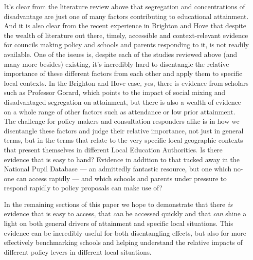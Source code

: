 \documentclass[
  11pt,
]{article}
\begin{document}
It's clear from the literature review above that segregation and
concentrations of disadvantage are just one of many factors contributing
to educational attainment. And it is also clear from the recent
experience in Brighton and Hove that despite the wealth of literature
out there, timely, accessible and context-relevant evidence for councils
making policy and schools and parents responding to it, is not readily
available. One of the issues is, despite each of the studies reviewed
above (and many more besides) existing, it's incredibly hard to
disentangle the relative importance of these different factors from each
other and apply them to specific local contexts. In the Brighton and
Hove case, yes, there is evidence from scholars such as Professor
Gorard, which points to the impact of social mixing and disadvantaged
segregation on attainment, but there is also a wealth of evidence on a
whole range of other factors such as attendance or low prior attainment.
The challenge for policy makers and consultation responders alike is in
how we disentangle these factors and judge their relative importance,
not just in general terms, but in the terms that relate to the very
specific local geographic contexts that present themselves in different
Local Education Authorities. Is there evidence that is easy to hand?
Evidence in addition to that tucked away in the National Pupil Database
--- an admittedly fantastic resource, but one which no-one can access
rapidly --- and which schools and parents under pressure to respond
rapidly to policy proposals can make use of?

In the remaining sections of this paper we hope to demonstrate that
there \emph{is} evidence that is easy to access, that \emph{can} be
accessed quickly and that \emph{can} shine a light on both general
drivers of attainment and specific local situations. This evidence can
be incredibly useful for both disentangling effects, but also for more
effectively benchmarking schools and helping understand the relative
impacts of different policy levers in different local situations.
\end{document}
